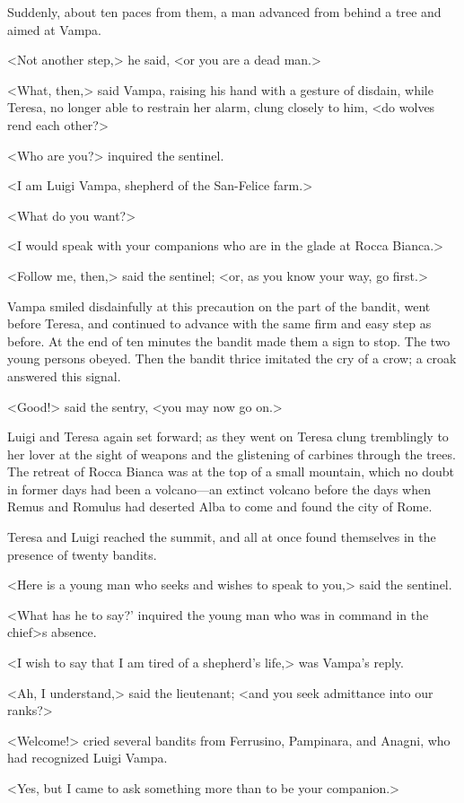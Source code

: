{Suddenly, about ten paces from them, a man advanced from behind a tree and aimed at Vampa. 

<Not another step,> he said, <or you are a dead man.> 

<What, then,> said Vampa, raising his hand with a gesture of disdain, while Teresa, no longer able to restrain her alarm, clung closely to him, <do wolves rend each other?> 

<Who are you?> inquired the sentinel. 

<I am Luigi Vampa, shepherd of the San-Felice farm.> 

<What do you want?> 

<I would speak with your companions who are in the glade at Rocca Bianca.> 

<Follow me, then,> said the sentinel; <or, as you know your way, go first.> 

Vampa smiled disdainfully at this precaution on the part of the bandit, went before Teresa, and continued to advance with the same firm and easy step as before. At the end of ten minutes the bandit made them a sign to stop. The two young persons obeyed. Then the bandit thrice imitated the cry of a crow; a croak answered this signal. 

<Good!> said the sentry, <you may now go on.> 

Luigi and Teresa again set forward; as they went on Teresa clung tremblingly to her lover at the sight of weapons and the glistening of carbines through the trees. The retreat of Rocca Bianca was at the top of a small mountain, which no doubt in former days had been a volcano—an extinct volcano before the days when Remus and Romulus had deserted Alba to come and found the city of Rome. 

Teresa and Luigi reached the summit, and all at once found themselves in the presence of twenty bandits. 

<Here is a young man who seeks and wishes to speak to you,> said the sentinel. 

<What has he to say?' inquired the young man who was in command in the chief>s absence. 

<I wish to say that I am tired of a shepherd's life,> was Vampa's reply. 

<Ah, I understand,> said the lieutenant; <and you seek admittance into our ranks?> 

<Welcome!> cried several bandits from Ferrusino, Pampinara, and Anagni, who had recognized Luigi Vampa. 

<Yes, but I came to ask something more than to be your companion.> 

}
